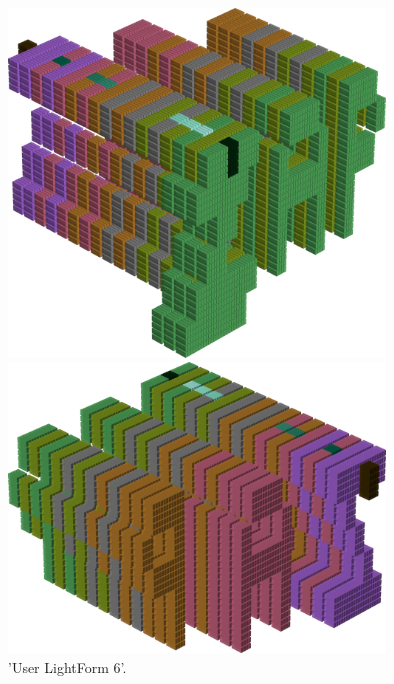 \begin{minipage}[b]{0.48\linewidth}
\vspace{1cm}
\begin{figure}[H]
    \centering
    \begin{adjustbox}{width=5cm,margin=0cm 0cm}
      \includegraphics[width=10cm]{src/colorspace_patterns/pattern14-45.png}%
    \end{adjustbox}
    \begin{adjustbox}{width=5cm,margin=0cm 0cm}
      \includegraphics[width=10cm]{src/colorspace_patterns/pattern14-225.png}%
    \end{adjustbox}
\caption{'User LightForm 6'.}
\end{figure}
\end{minipage}
